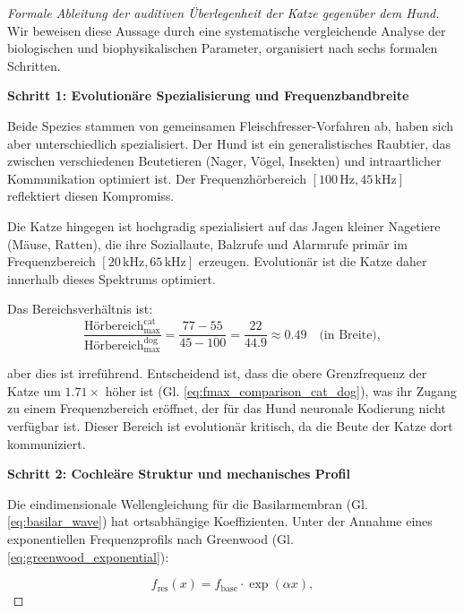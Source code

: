 ﻿\documentclass[12pt, a4paper]{article}
\theoremstyle{definition}
\theoremstyle{remark}
\begin{document}
\begin{proof}[Formale Ableitung der auditiven Überlegenheit der Katze gegenüber dem Hund]

Wir beweisen diese Aussage durch eine systematische vergleichende Analyse der biologischen und biophysikalischen Parameter, organisiert nach sechs formalen Schritten.

\textbf{Schritt 1: Evolutionäre Spezialisierung und Frequenzbandbreite}

Beide Spezies stammen von gemeinsamen Fleischfresser-Vorfahren ab, haben sich aber unterschiedlich spezialisiert. Der Hund ist ein generalistisches Raubtier, das zwischen verschiedenen Beutetieren (Nager, Vögel, Insekten) und intraartlicher Kommunikation optimiert ist. Der Frequenzhörbereich $[100\,\mathrm{Hz}, 45\,\mathrm{kHz}]$ reflektiert diesen Kompromiss.

Die Katze hingegen ist hochgradig spezialisiert auf das Jagen kleiner Nagetiere (Mäuse, Ratten), die ihre Soziallaute, Balzrufe und Alarmrufe primär im Frequenzbereich $[20\,\mathrm{kHz}, 65\,\mathrm{kHz}]$ erzeugen. Evolutionär ist die Katze daher innerhalb dieses Spektrums optimiert.

Das Bereichsverhältnis ist:
\begin{equation}
\frac{\text{Hörbereich}_{\max}^{\mathrm{cat}}}{\text{Hörbereich}_{\max}^{\mathrm{dog}}} = \frac{77 - 55}{45 - 100} = \frac{22}{44.9} \approx 0.49 \quad \text{(in Breite)},
\label{eq:bandwidth_ratio}
\end{equation}

aber dies ist irreführend. Entscheidend ist, dass die obere Grenzfrequenz der Katze um $1.71\times$ höher ist (Gl. \ref{eq:fmax_comparison_cat_dog}), was ihr Zugang zu einem Frequenzbereich eröffnet, der für das Hund neuronale Kodierung nicht verfügbar ist. Dieser Bereich ist evolutionär kritisch, da die Beute der Katze dort kommuniziert.

\textbf{Schritt 2: Cochleäre Struktur und mechanisches Profil}

Die eindimensionale Wellengleichung für die Basilarmembran (Gl. \ref{eq:basilar_wave}) hat ortsabhängige Koeffizienten. Unter der Annahme eines exponentiellen Frequenzprofils nach Greenwood (Gl. \ref{eq:greenwood_exponential}):

\begin{equation}
f_{\text{res}}(x) = f_{\text{base}} \cdot \exp\left(\alpha x\right),
\label{eq:greenwood_exponential}
\end{equation}


\end{proof}
\end{document}

